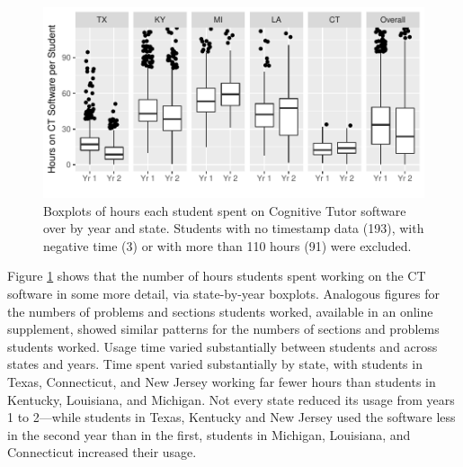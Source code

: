 \documentclass[12pt]{article}\usepackage[]{graphicx}\usepackage[]{color}
\makeatletter
\def\maxwidth{ %
  \ifdim\Gin@nat@width>\linewidth
    \linewidth
  \else
    \Gin@nat@width
  \fi
}
\makeatother
\begin{document}
\begin{figure}
\centering

\includegraphics[width=\maxwidth]{figure/usageTime-1} 

\caption{Boxplots of hours each student spent on Cognitive Tutor
  software over by year and state. Students  with no timestamp data
  (193), with negative time
  (3) or with more than 110 hours (91)
  were excluded.}
\label{fig:timeByStud}
\end{figure}






Figure \ref{fig:timeByStud} shows that the number of hours students
spent working on the CT software in some more detail, via
state-by-year boxplots.
Analogous figures for the numbers of problems and sections students
worked, available in an online supplement, showed similar patterns for
the numbers of sections and problems students worked.
Usage time varied substantially between students and across states and
years.
Time spent varied substantially by state, with students in Texas,
Connecticut, and New Jersey working far fewer hours than students in
Kentucky, Louisiana, and Michigan.
Not every state reduced its usage from years 1 to 2---while students
in Texas, Kentucky and New Jersey used the software less in the second
year than in the first, students in Michigan, Louisiana, and
Connecticut increased their usage.
\end{document}
